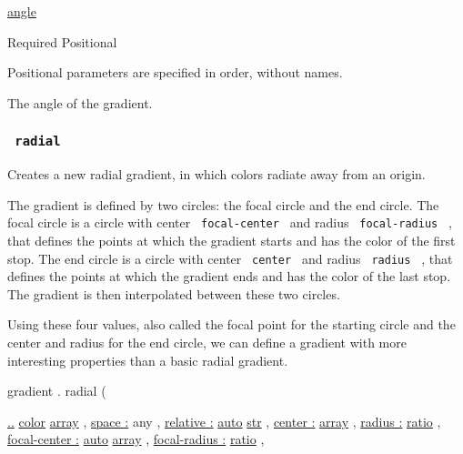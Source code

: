 \href{/docs/reference/layout/angle/}{angle}

{Required} {{ Positional }}

\label{definitions-linear-angle-positional-tooltip}
Positional parameters are specified in order, without names.

The angle of the gradient.

\subsubsection{\texorpdfstring{\texttt{\ radial\ }}{ radial }}\label{definitions-radial}

Creates a new radial gradient, in which colors radiate away from an
origin.

The gradient is defined by two circles: the focal circle and the end
circle. The focal circle is a circle with center
\texttt{\ focal-center\ } and radius \texttt{\ focal-radius\ } , that
defines the points at which the gradient starts and has the color of the
first stop. The end circle is a circle with center \texttt{\ center\ }
and radius \texttt{\ radius\ } , that defines the points at which the
gradient ends and has the color of the last stop. The gradient is then
interpolated between these two circles.

Using these four values, also called the focal point for the starting
circle and the center and radius for the end circle, we can define a
gradient with more interesting properties than a basic radial gradient.

gradient { . } { radial } (

{ \hyperref[definitions-radial-parameters-stops]{..}
\href{/docs/reference/visualize/color/}{color}
\href{/docs/reference/foundations/array/}{array} , } {
\hyperref[definitions-radial-parameters-space]{space :} { any } , } {
\hyperref[definitions-radial-parameters-relative]{relative :}
\href{/docs/reference/foundations/auto/}{auto}
\href{/docs/reference/foundations/str/}{str} , } {
\hyperref[definitions-radial-parameters-center]{center :}
\href{/docs/reference/foundations/array/}{array} , } {
\hyperref[definitions-radial-parameters-radius]{radius :}
\href{/docs/reference/layout/ratio/}{ratio} , } {
\hyperref[definitions-radial-parameters-focal-center]{focal-center :}
\href{/docs/reference/foundations/auto/}{auto}
\href{/docs/reference/foundations/array/}{array} , } {
\hyperref[definitions-radial-parameters-focal-radius]{focal-radius :}
\href{/docs/reference/layout/ratio/}{ratio} , }

